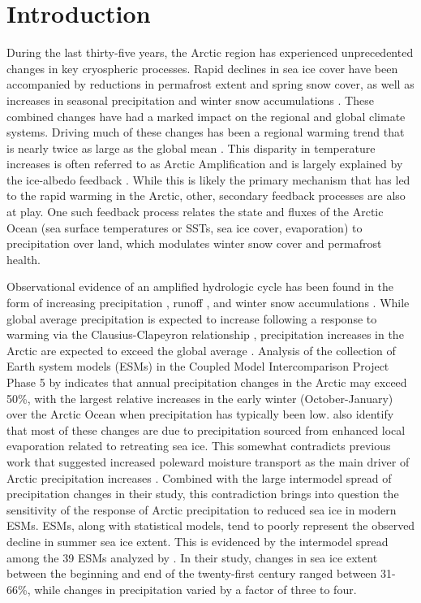 \section{Introduction}
\label{sec:intro_ch5}

During the last thirty-five years, the Arctic region has experienced unprecedented changes in key cryospheric processes.
Rapid declines in sea ice cover have been accompanied by reductions in permafrost extent and spring snow cover, as well as increases in seasonal precipitation and winter snow accumulations \citep{Kohler_2006,Callaghan_2011,Bulygina_2009,Screen_2012}.
These combined changes have had a marked impact on the regional and global climate systems.
Driving much of these changes has been a regional warming trend that is nearly twice as large as the global mean \citep{Serreze_2006c,Screen_2010}.
This disparity in temperature increases is often referred to as Arctic Amplification and is largely explained by the ice-albedo feedback \citep{Curry_1995}.
While this is likely the primary mechanism that has led to the rapid warming in the Arctic, other, secondary feedback processes are also at play.
One such feedback process relates the state and fluxes of the Arctic Ocean (sea surface temperatures or SSTs, sea ice cover, evaporation) to precipitation over land, which modulates winter snow cover and permafrost health.

Observational evidence of an amplified hydrologic cycle \citep{Stocker_2005} has been found in the form of increasing precipitation \citep{Rawlins_2006}, runoff \citep{Peterson_2002}, and winter snow accumulations \citep{Kohler_2006,Bulygina_2009,Screen_2012}.
While global average precipitation is expected to increase following a response to warming via the Clausius-Clapeyron relationship \citep[e.g.][]{Held_2006,Stephens_2008,Byrne_2015}, precipitation increases in the Arctic are expected to exceed the global average \citep{Stocker_2005}.
Analysis of the collection of Earth system models (ESMs) in the Coupled Model Intercomparison Project Phase 5 \citep[CMIP5;][]{Taylor_2012} by \citet{Bintanja_2014} indicates that annual precipitation changes in the Arctic may exceed 50\%, with the largest relative increases in the early winter (October-January) over the Arctic Ocean when precipitation has typically been low.
\citet{Bintanja_2014} also identify that most of these changes are due to precipitation sourced from enhanced local evaporation related to retreating sea ice.
This somewhat contradicts previous work that suggested increased poleward moisture transport as the main driver of Arctic precipitation increases \citep{Bengtsson_2011}.
Combined with the large intermodel spread of precipitation changes in their study, this contradiction brings into question the sensitivity of the response of Arctic precipitation to reduced sea ice in modern ESMs.
ESMs, along with statistical models, tend to poorly represent the observed decline in summer sea ice extent.
This is evidenced by the intermodel spread among the 39 ESMs analyzed by \citet{Bintanja_2014}.
In their study, changes in sea ice extent between the beginning and end of the twenty-first century ranged between 31-66\%, while changes in precipitation varied by a factor of three to four.

